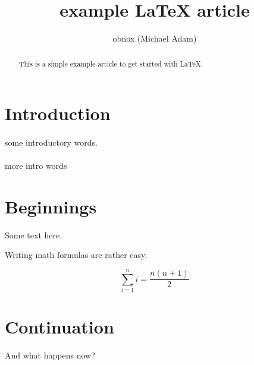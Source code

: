 \documentclass{article}
\title{example {\LaTeX} article}
\author{obnox (Michael Adam)}
\begin{document}
\maketitle
\begin{abstract}

    This is a simple  example article to get started with  {\LaTeX}.

\end{abstract}

\tableofcontents

\section*{Introduction}

\paragraph{} some introductory words.

\paragraph{} more  intro words



\section{Beginnings}

Some text here.


Writing math formulas are rather easy.


\[ \sum_{i=1}^{n}i = \frac{n(n+1)}{2} \]

\section{Continuation}

And what happens now?
\end{document}
